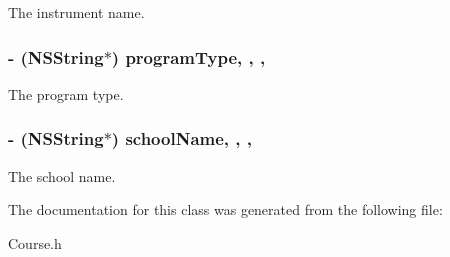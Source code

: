 The instrument name. \hypertarget{interface_course_a75b262e8885356165a97a15b69bf1ff1}{
\subsubsection[{program\+Type}]{\setlength{\rightskip}{0pt plus 5cm}-\/ (N\+S\+String$\ast$) program\+Type\hspace{0.3cm}{\ttfamily [read]}, {\ttfamily [write]}, {\ttfamily [nonatomic]}, {\ttfamily [assign]}}}\label{interface_course_a75b262e8885356165a97a15b69bf1ff1}
The program type. \hypertarget{interface_course_abb8051bfc97aff735cbb00e75f2fef65}{
\subsubsection[{school\+Name}]{\setlength{\rightskip}{0pt plus 5cm}-\/ (N\+S\+String$\ast$) school\+Name\hspace{0.3cm}{\ttfamily [read]}, {\ttfamily [write]}, {\ttfamily [nonatomic]}, {\ttfamily [assign]}}}\label{interface_course_abb8051bfc97aff735cbb00e75f2fef65}
The school name. 

The documentation for this class was generated from the following file\+:\begin{DoxyCompactItemize}
\item 
Course.\+h\end{DoxyCompactItemize}
